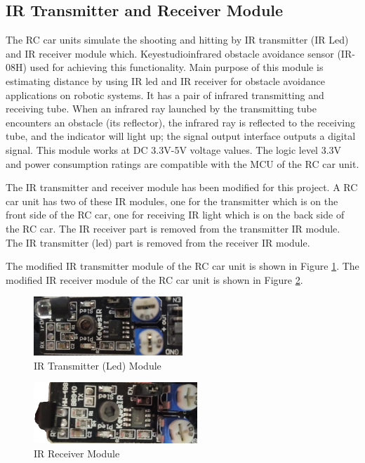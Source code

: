\subsection{IR Transmitter and Receiver Module}
\label{sec_ir_modules}
The RC car units simulate the shooting and hitting by IR transmitter (IR Led) and IR receiver module which. Keyestudio\texttrademark\;infrared obstacle avoidance sensor (IR-08H) used for achieving this functionality. Main purpose of this module is estimating distance by using IR led and IR receiver for obstacle avoidance applications on robotic systems. It has a pair of infrared transmitting and receiving tube. When an infrared ray launched by the transmitting tube encounters an obstacle (its reflector), the infrared ray is reflected to the receiving tube, and the indicator will light up; the signal output interface outputs a digital signal. This module works at DC 3.3V-5V voltage values. The logic level 3.3V and power consumption ratings are compatible with the MCU of the RC car unit.

The IR transmitter and receiver module has been modified for this project. A RC car unit has two of these IR modules, one for the transmitter which is on the front side of the RC car, one for receiving IR light which is on the back side of the RC car. The IR receiver part is removed from the transmitter IR module. The IR transmitter (led) part is removed from the receiver IR module.

The modified IR transmitter module of the RC car unit is shown in Figure \ref{fig:ir_transmitter}. The modified IR receiver module of the RC car unit is shown in Figure \ref{fig:ir_receiver}.

\begin{figure}[!htbp]
    \centering
    \includegraphics[width=0.50\textwidth]{Imgs/ir_transmitter.jpeg}
    \caption{\label{fig:ir_transmitter}IR Transmitter (Led) Module}
\end{figure}

\begin{figure}[!htbp]
    \centering
    \includegraphics[width=0.55\textwidth]{Imgs/ir_receiver.jpeg}
    \caption{\label{fig:ir_receiver}IR Receiver Module}
\end{figure}


